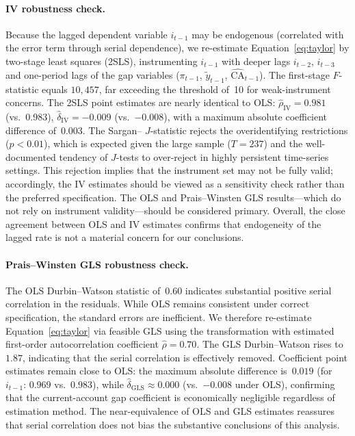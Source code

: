 \paragraph{IV robustness check.}
Because the lagged dependent variable $i_{t-1}$ may be endogenous (correlated with the error term through serial dependence), we re-estimate Equation~\eqref{eq:taylor} by two-stage least squares (2SLS), instrumenting $i_{t-1}$ with deeper lags $i_{t-2}$, $i_{t-3}$ and one-period lags of the gap variables ($\pi_{t-1}$, $\tilde{y}_{t-1}$, $\widehat{\text{CA}}_{t-1}$).  The first-stage $F$-statistic equals $10{,}457$, far exceeding the \citet{stockyogo2005} threshold of~10 for weak-instrument concerns.  The 2SLS point estimates are nearly identical to OLS: $\hat{\rho}_{\text{IV}} = 0.981$ (vs.\ 0.983), $\hat{\delta}_{\text{IV}} = -0.009$ (vs.\ $-0.008$), with a maximum absolute coefficient difference of~0.003.  The Sargan--\citet{hansen1982large} $J$-statistic rejects the overidentifying restrictions ($p < 0.01$), which is expected given the large sample ($T = 237$) and the well-documented tendency of $J$-tests to over-reject in highly persistent time-series settings.  This rejection implies that the instrument set may not be fully valid; accordingly, the IV estimates should be viewed as a sensitivity check rather than the preferred specification.  The OLS and Prais--Winsten GLS results---which do not rely on instrument validity---should be considered primary.  Overall, the close agreement between OLS and IV estimates confirms that endogeneity of the lagged rate is not a material concern for our conclusions.

\paragraph{Prais--Winsten GLS robustness check.}
The OLS Durbin--Watson statistic of~$0.60$ indicates substantial positive serial correlation in the residuals.  While OLS remains consistent under correct specification, the standard errors are inefficient.  We therefore re-estimate Equation~\eqref{eq:taylor} via feasible GLS using the \citet{prais1954trend} transformation with estimated first-order autocorrelation coefficient $\hat{\rho} = 0.70$.  The GLS Durbin--Watson rises to~$1.87$, indicating that the serial correlation is effectively removed.  Coefficient point estimates remain close to OLS: the maximum absolute difference is~$0.019$ (for $i_{t-1}$: $0.969$ vs.\ $0.983$), while $\hat{\delta}_{\text{GLS}} \approx 0.000$ (vs.\ $-0.008$ under OLS), confirming that the current-account gap coefficient is economically negligible regardless of estimation method.  The near-equivalence of OLS and GLS estimates reassures that serial correlation does not bias the substantive conclusions of this analysis.

